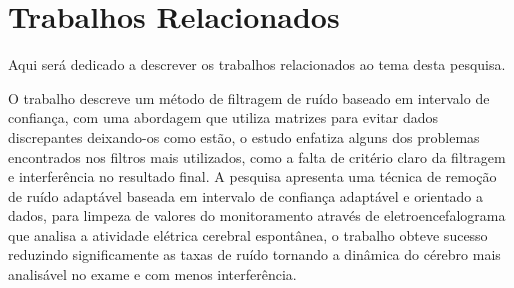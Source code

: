 

\chapter{Trabalhos Relacionados}\label{referencial_teorico}
Aqui será dedicado a descrever os trabalhos relacionados ao tema desta pesquisa.

O trabalho \cite{kalambet2011noise} descreve um método de filtragem de ruído baseado em intervalo de confiança, com uma abordagem que utiliza matrizes para evitar dados discrepantes deixando-os como estão, o estudo enfatiza alguns dos problemas encontrados nos filtros mais utilizados, como a falta de critério claro da filtragem e interferência no resultado final. A pesquisa \cite{madhale2020adaptive} apresenta uma técnica de remoção de ruído adaptável baseada em intervalo de confiança adaptável e orientado a dados, para limpeza de valores do monitoramento através de eletroencefalograma que analisa a atividade elétrica cerebral espontânea, o trabalho obteve sucesso reduzindo significamente as taxas de ruído tornando a dinâmica do cérebro mais analisável no exame e com menos interferência.
 






